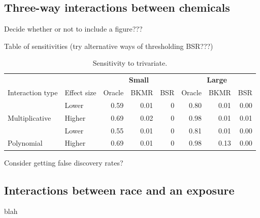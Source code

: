 \documentclass[12pt, twoside]{amherstthesis}
\begin{document}
\hypertarget{three-way-interactions-between-chemicals}{%
\subsection{Three-way interactions between chemicals}\label{three-way-interactions-between-chemicals}}

Decide whether or not to include a figure???

Table of sensitivities (try alternative ways of thresholding BSR???)
\begin{table}

\caption{\label{tab:threewaysens}Sensitivity to trivariate.}
\centering
\begin{tabular}[t]{llrrrrrr}
\toprule
\multicolumn{2}{c}{\textbf{ }} & \multicolumn{3}{c}{\textbf{Small}} & \multicolumn{3}{c}{\textbf{Large}} \\
\cmidrule(l{3pt}r{3pt}){3-5} \cmidrule(l{3pt}r{3pt}){6-8}
Interaction type & Effect size & Oracle & BKMR & BSR & Oracle & BKMR & BSR\\
\midrule
 & Lower & 0.59 & 0.01 & 0 & 0.80 & 0.01 & 0.00\\

\multirow{-2}{*}{\raggedright\arraybackslash Multiplicative} & Higher & 0.69 & 0.02 & 0 & 0.98 & 0.01 & 0.01\\
\addlinespace
 & Lower & 0.55 & 0.01 & 0 & 0.81 & 0.01 & 0.00\\

\multirow{-2}{*}{\raggedright\arraybackslash Polynomial} & Higher & 0.69 & 0.01 & 0 & 0.98 & 0.13 & 0.00\\
\bottomrule
\end{tabular}
\end{table}
Consider getting false discovery rates?

\hypertarget{interactions-between-race-and-an-exposure}{%
\subsection{Interactions between race and an exposure}\label{interactions-between-race-and-an-exposure}}

blah
\end{document}

